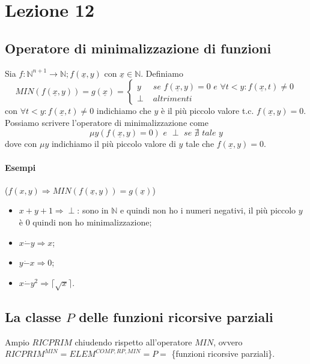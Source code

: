 \documentclass{article}
\begin{document}
\section{Lezione 12}
\subsection{Operatore di minimalizzazione di funzioni}
Sia $f:\mathbb{N}^{n+1} \rightarrow \mathbb{N}; f(\underline{x},y)$ con $\underline{x} \in \mathbb{N}$. Definiamo 
\begin{displaymath}
	MIN(f(\underline{x},y))=g(\underline{x})=
	\begin{cases}
		y &\textit{ se } f(\underline{x},y)=0 \textit{ e } \forall t<y:f(\underline{x},t)\neq 0 \\
		\perp &\textit{ altrimenti}
	\end{cases}
\end{displaymath}
con $\forall t<y:f(\underline{x},t)\neq 0$ indichiamo che $y$ è il più piccolo valore t.c. $f(\underline{x},y)=0$. Possiamo scrivere l'operatore di minimalizzazione come
\begin{displaymath}
	\mu y (f(\underline{x},y)=0) \textit{ e } \perp \textit{ se } \nexists  \textit{ tale } y
\end{displaymath}
dove con $\mu y$ indichiamo il più piccolo valore di $y$ tale che $f(\underline{x},y)=0$.
\paragraph{Esempi} ($f(x,y) \Rightarrow MIN(f(\underline{x},y))=g(\underline{x})$)
\begin{itemize}
	\item $x+y+1 \Rightarrow \perp$: sono in $\mathbb{N}$ e quindi non ho i numeri negativi, il più piccolo $y$ è 0 quindi non ho minimalizzazione;
	\item $ x \dot{-} y \Rightarrow x $;
	\item $ y \dot{-} x \Rightarrow 0 $;
	\item $ x \dot{-} y^2 \Rightarrow \lceil \sqrt{x} \rceil $.
\end{itemize}
\subsection{La classe $P$ delle funzioni ricorsive parziali}
Ampio $RICPRIM$ chiudendo rispetto all'operatore $MIN$, ovvero $RICPRIM^{MIN} = ELEM^{COMP,RP,MIN} = P =$ \{funzioni ricorsive parziali\}.
\end{document}
